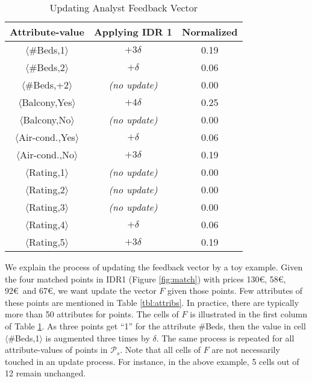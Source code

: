 \documentclass{vldb}
\begin{document}
\begin{table}[]
\centering
\caption{Updating Analyst Feedback Vector}
\label{tbl:feedback}
\begin{tabular}{|c|c|c|}
\hline
\textbf{Attribute-value}               & \textbf{Applying IDR 1} & \textbf{Normalized} \\ \hline
$\langle$\#Beds,1$\rangle$                   & $+3\delta$                       & 0.19                 \\ \hline
$\langle$\#Beds,2$\rangle$                 & $+\delta$                       & 0.06                 \\ \hline
$\langle$\#Beds,+2$\rangle$                  & {\em (no update)}                       & 0.00                    \\ \hline
$\langle$Balcony,Yes$\rangle$                   & $+4\delta$                      & 0.25                 \\ \hline
$\langle$Balcony,No$\rangle$                    & {\em (no update)}                        & 0.00                    \\ \hline
$\langle$Air-cond.,Yes$\rangle$               & $+\delta$                       & 0.06                 \\ \hline
$\langle$Air-cond.,No$\rangle$                & $+3\delta$                       & 0.19                 \\ \hline
$\langle$Rating,1$\rangle$                    & {\em (no update)}                       & 0.00                    \\ \hline
$\langle$Rating,2$\rangle$                     & {\em (no update)}                        & 0.00                    \\ \hline
$\langle$Rating,3$\rangle$                    & {\em (no update)}                        & 0.00                   \\ \hline
$\langle$Rating,4$\rangle$                   & $+\delta$                       & 0.06                 \\ \hline
$\langle$Rating,5$\rangle$                     & $+3\delta$                      & 0.19                 \\ \hline
\end{tabular}
\end{table}

\vspace{2pt}
We explain the process of updating the feedback vector by a toy example. Given the four matched points in IDR1 (Figure \ref{fig:match}) with prices 130\euro, 58\euro, 92\euro\ and 67\euro, we want update the vector $F$ given those points. Few attributes of these points are mentioned in Table \ref{tbl:attribs}. In practice, there are typically more than 50 attributes for points. The cells of $F$ is illustrated in the first column of Table \ref{tbl:feedback}. As three points get ``1'' for the attribute \#Beds, then the value in cell $\langle$\#Beds,1$\rangle$ is augmented three times by $\delta$. The same process is repeated for all attribute-values of points in $\mathcal{P}_s$. Note that all cells of $F$ are not necessarily touched in an update process. For instance, in the above example, 5 cells out of 12 remain unchanged.
\end{document}
